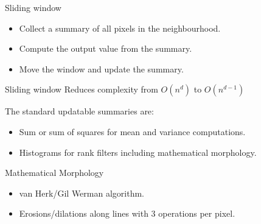 \documentclass[pdf,prettybox]{prosper}
\begin{document}

\begin{slide}{Sliding window}
\begin{itemize}
\item Collect a summary of all pixels in the neighbourhood.
\item Compute the output value from the summary.
\item Move the window and update the summary.
\end{itemize}
\end{slide}

\begin{slide}{Sliding window}
Reduces complexity from $O(n^d)$ to $O(n^{d-1})$

The standard updatable summaries are:
\begin{itemize}
\item Sum or sum of squares for mean and variance computations.
\item Histograms for rank filters including mathematical morphology.
\end{itemize}
\end{slide}

\begin{slide}{Mathematical Morphology}
\begin{itemize}
\item van Herk/Gil Werman algorithm.
\item Erosions/dilations along lines with 3 operations per pixel.
\end{itemize}
\end{slide}
\end{document}
